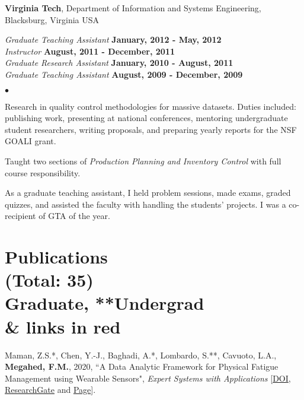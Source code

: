 \documentclass[margin,line]{res}
\newenvironment{list2}{
  \begin{list}{$\bullet$}{%
      \setlength{\itemsep}{0in}
      \setlength{\parsep}{0in} \setlength{\parskip}{0in}
      \setlength{\topsep}{0in} \setlength{\partopsep}{0in} 
      \setlength{\leftmargin}{0.2in}}}{\end{list}}
\begin{document}
\begin{resume}
{\bf Virginia Tech}, Department of Information and Systems Engineering, Blacksburg, Virginia USA

\vspace{-3.5mm}
{\em Graduate Teaching Assistant} \hfill {\bf January, 2012 - May, 2012}\\
{\em Instructor} \hfill {\bf August, 2011 - December, 2011}\\
{\em Graduate Research Assistant} \hfill {\bf January, 2010 - August, 2011}\\
{\em Graduate Teaching Assistant} \hfill {\bf August, 2009 - December, 2009}\\

\vspace{-3.5mm}
\begin{list2}
	\item Research in quality control methodologies for massive datasets. Duties included: publishing work, presenting at national conferences, mentoring undergraduate student researchers, writing proposals, and preparing yearly reports for the NSF GOALI grant.
	\item Taught two sections of \textit{Production Planning and Inventory Control} with full course responsibility.
	\item As a graduate teaching assistant, I held problem sessions, made exams, graded quizzes, and assisted the faculty with handling the students' projects. I was a co-recipient of GTA of the year.
\end{list2}


\section{\sc Publications \\ (Total: 35) \\ \lbrack*Graduate, **Undergrad \\ \& links in \textcolor{miamired}{red}\rbrack}

Maman, Z.S.*, Chen, Y.-J., Baghadi, A.*, Lombardo, S.**, Cavuoto, L.A., \textbf{Megahed, F.M.}, 2020, ``A Data Analytic Framework for Physical Fatigue Management using Wearable Sensors", \textit{Expert Systems with Applications} [\faFile*\href{https://doi.org/10.1016/j.eswa.2020.113405}{DOI}, \faResearchgate \href{https://www.researchgate.net/publication/340734757_A_data_analytic_framework_for_physical_fatigue_management_using_wearable_sensors}{ResearchGate} and \faGithub \href{https://zahrame.github.io/FatigueManagement.github.io/}{Page}]. 


\end{resume}
\end{document}
